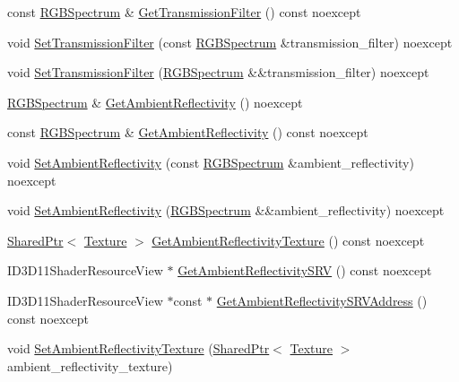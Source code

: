 \begin{DoxyCompactItemize}
const \hyperlink{structmage_1_1_r_g_b_spectrum}{R\+G\+B\+Spectrum} \& \hyperlink{structmage_1_1_material_a38071483e6d47eedb02b2e5c912073e7}{Get\+Transmission\+Filter} () const noexcept
\item 
void \hyperlink{structmage_1_1_material_afe8121e13eb9fff9ffb281e7c807f2e0}{Set\+Transmission\+Filter} (const \hyperlink{structmage_1_1_r_g_b_spectrum}{R\+G\+B\+Spectrum} \&transmission\+\_\+filter) noexcept
\item 
void \hyperlink{structmage_1_1_material_abc6f63bd40b00c81bc799ef1f2ca01e9}{Set\+Transmission\+Filter} (\hyperlink{structmage_1_1_r_g_b_spectrum}{R\+G\+B\+Spectrum} \&\&transmission\+\_\+filter) noexcept
\item 
\hyperlink{structmage_1_1_r_g_b_spectrum}{R\+G\+B\+Spectrum} \& \hyperlink{structmage_1_1_material_a244df193031de84daf6cb9b8c30f0d72}{Get\+Ambient\+Reflectivity} () noexcept
\item 
const \hyperlink{structmage_1_1_r_g_b_spectrum}{R\+G\+B\+Spectrum} \& \hyperlink{structmage_1_1_material_ad13afcccbb9b73cddd23a8586e77136e}{Get\+Ambient\+Reflectivity} () const noexcept
\item 
void \hyperlink{structmage_1_1_material_a7a5cf55e733d2180865d5f6d9758336c}{Set\+Ambient\+Reflectivity} (const \hyperlink{structmage_1_1_r_g_b_spectrum}{R\+G\+B\+Spectrum} \&ambient\+\_\+reflectivity) noexcept
\item 
void \hyperlink{structmage_1_1_material_a0c5f2c3a8b79c8498e9501e33acf8147}{Set\+Ambient\+Reflectivity} (\hyperlink{structmage_1_1_r_g_b_spectrum}{R\+G\+B\+Spectrum} \&\&ambient\+\_\+reflectivity) noexcept
\item 
\hyperlink{namespacemage_a1e01ae66713838a7a67d30e44c67703e}{Shared\+Ptr}$<$ \hyperlink{classmage_1_1_texture}{Texture} $>$ \hyperlink{structmage_1_1_material_a231f4f13768d54af5a587266f45d734c}{Get\+Ambient\+Reflectivity\+Texture} () const noexcept
\item 
I\+D3\+D11\+Shader\+Resource\+View $\ast$ \hyperlink{structmage_1_1_material_ab0d0618400f2eb7cefecfa5c6da2192b}{Get\+Ambient\+Reflectivity\+S\+RV} () const noexcept
\item 
I\+D3\+D11\+Shader\+Resource\+View $\ast$const  $\ast$ \hyperlink{structmage_1_1_material_a52b0428fb9aeba97dcd8b5c7eb09836f}{Get\+Ambient\+Reflectivity\+S\+R\+V\+Address} () const noexcept
\item 
void \hyperlink{structmage_1_1_material_a220430d91bcc02a78a8e1601d7725417}{Set\+Ambient\+Reflectivity\+Texture} (\hyperlink{namespacemage_a1e01ae66713838a7a67d30e44c67703e}{Shared\+Ptr}$<$ \hyperlink{classmage_1_1_texture}{Texture} $>$ ambient\+\_\+reflectivity\+\_\+texture)

\end{DoxyCompactItemize}
